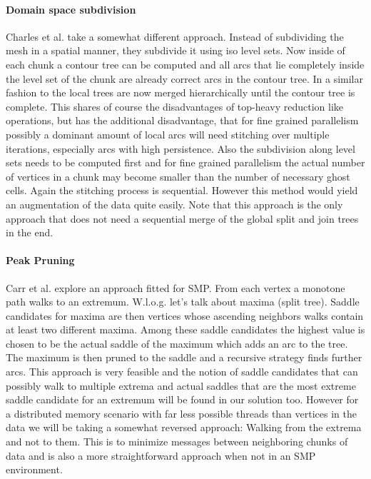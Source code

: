 \documentclass{scrartcl}
\begin{document}
\paragraph{Domain space subdivision}
Charles et al. \cite{Charles} take a somewhat different approach. Instead of subdividing the mesh in a spatial manner, they subdivide it using iso level sets. Now inside of each chunk a contour tree can be computed and all arcs that lie completely inside the level set of the chunk are already correct arcs in the contour tree. In a similar fashion to \cite{pascucci1} the local trees are now merged hierarchically until the contour tree is complete. This shares of course the disadvantages of top-heavy reduction like operations, but has the additional disadvantage, that for fine grained parallelism possibly a dominant amount of local arcs will need stitching over multiple iterations, especially arcs with high persistence. Also the subdivision along level sets needs to be computed first and for fine grained parallelism the actual number of vertices in a chunk may become smaller than the number of necessary ghost cells. Again the stitching process is sequential. However this method would yield an augmentation of the data quite easily. Note that this approach is the only approach that does not need a sequential merge of the global split and join trees in the end.

\paragraph{Peak Pruning}
Carr et al. \cite{Carr} explore an approach fitted for SMP. From each vertex a monotone path walks to an extremum. W.l.o.g. let's talk about maxima (split tree). Saddle candidates for maxima are then vertices whose ascending neighbors walks contain at least two different maxima. Among these saddle candidates the highest value is chosen to be the actual saddle of the maximum which adds an arc to the tree. The maximum is then pruned to the saddle and a recursive strategy finds further arcs. This approach is very feasible and the notion of saddle candidates that can possibly walk to multiple extrema and actual saddles that are the most extreme saddle candidate for an extremum will be found in our solution too. However for a distributed memory scenario with far less possible threads than vertices in the data we will be taking a somewhat reversed approach: Walking from the extrema and not to them. This is to minimize messages between neighboring chunks of data and is also a more straightforward approach when not in an SMP environment. 
\end{document}
